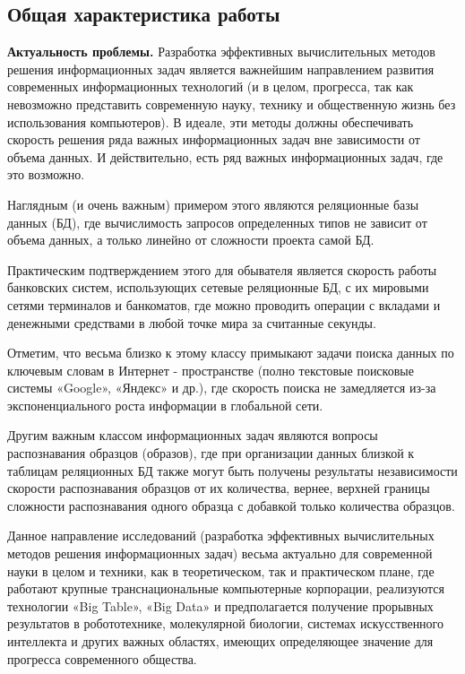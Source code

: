  \setlength{\footskip}{1cm} 

\subsection*{\Large Общая характеристика работы}
\fontsize{14pt}{15pt}\selectfont

\textbf{Актуальность проблемы.}  Разработка эффективных вычислительных  методов решения информационных задач является важнейшим направлением развития современных информационных технологий (и в целом, прогресса, так как невозможно представить современную науку,  технику  и общественную жизнь без использования компьютеров). 
В идеале, эти методы должны обеспечивать скорость решения ряда важных информационных задач вне зависимости от объема данных. И действительно, есть ряд важных  информационных задач, где это возможно. 

Наглядным (и очень важным) примером  этого являются реляционные базы данных (БД), где вычислимость запросов определенных типов не зависит от объема данных, а только линейно от сложности проекта самой БД.

Практическим подтверждением этого для обывателя является скорость работы банковских систем, использующих сетевые реляционные БД,  с их мировыми сетями терминалов и банкоматов, где можно проводить операции с вкладами и денежными средствами в любой точке мира за считанные секунды.

Отметим, что весьма близко к этому классу  примыкают задачи поиска данных по ключевым словам в Интернет - пространстве (полно текстовые поисковые системы «Google», «Яндекс» и др.), где скорость поиска не замедляется из-за экспоненциального роста информации в глобальной сети.

Другим  важным классом информационных задач являются вопросы распознавания  образцов (образов), где при организации данных близкой к таблицам реляционных БД также могут быть получены результаты независимости скорости  распознавания  образцов от их количества, вернее, верхней границы сложности распознавания одного образца с добавкой только количества образцов. 

Данное направление исследований (разработка эффективных вычислительных  методов решения информационных задач) весьма актуально для современной  науки в целом и техники, как в теоретическом, так и  практическом плане, где работают крупные транснациональные компьютерные корпорации, реализуются технологии «Big Table»,  «Big Data» и предполагается получение прорывных результатов в робототехнике, молекулярной биологии, системах искусственного интеллекта и других важных областях, имеющих определяющее значение для прогресса современного общества.

